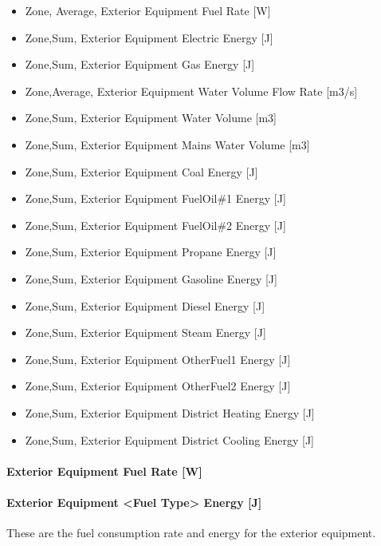 \begin{itemize}
\item
  Zone, Average, Exterior Equipment Fuel Rate {[}W{]}
\item
  Zone,Sum, Exterior Equipment Electric Energy {[}J{]}
\item
  Zone,Sum, Exterior Equipment Gas Energy {[}J{]}
\item
  Zone,Average, Exterior Equipment Water Volume Flow Rate {[}m3/s{]}
\item
  Zone,Sum, Exterior Equipment Water Volume {[}m3{]}
\item
  Zone,Sum, Exterior Equipment Mains Water Volume {[}m3{]}
\item
  Zone,Sum, Exterior Equipment Coal Energy {[}J{]}
\item
  Zone,Sum, Exterior Equipment FuelOil\#1 Energy {[}J{]}
\item
  Zone,Sum, Exterior Equipment FuelOil\#2 Energy {[}J{]}
\item
  Zone,Sum, Exterior Equipment Propane Energy {[}J{]}
\item
  Zone,Sum, Exterior Equipment Gasoline Energy {[}J{]}
\item
  Zone,Sum, Exterior Equipment Diesel Energy {[}J{]}
\item
  Zone,Sum, Exterior Equipment Steam Energy {[}J{]}
\item
  Zone,Sum, Exterior Equipment OtherFuel1 Energy {[}J{]}
\item
  Zone,Sum, Exterior Equipment OtherFuel2 Energy {[}J{]}
\item
  Zone,Sum, Exterior Equipment District Heating Energy {[}J{]}
\item
  Zone,Sum, Exterior Equipment District Cooling Energy {[}J{]}
\end{itemize}

\paragraph{Exterior Equipment Fuel Rate {[}W{]}}\label{exterior-equipment-fuel-rate-w}

\paragraph{Exterior Equipment \textless{}Fuel Type\textgreater{} Energy {[}J{]}}\label{exterior-equipment-fuel-type-energy-j}

These are the fuel consumption rate and energy for the exterior equipment.

